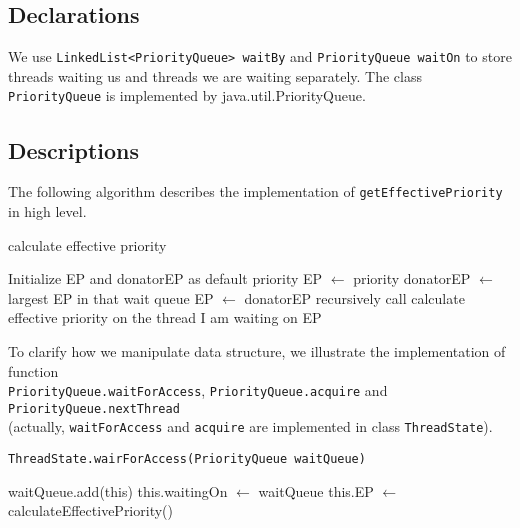\documentclass{article}
\begin{document}
\begin{spacing}{1.1}
    \subsection{Declarations}

    We use \texttt{LinkedList<PriorityQueue> waitBy} and \texttt{PriorityQueue waitOn} to store threads waiting us and threads we are waiting separately. The class \texttt{PriorityQueue} is implemented by java.util.PriorityQueue.

    \subsection{Descriptions}

    The following algorithm describes the implementation of \texttt{getEffectivePriority} in high level.

    \begin{algorithm}
      \caption{calculate effective priority}
      \begin{algorithmic}[1]
	\STATE Initialize EP and donatorEP as default priority
	\STATE EP $\leftarrow$ priority
	\STATE donatorEP $\leftarrow$ largest EP in that wait queue
	\STATE EP $\leftarrow$ donatorEP
	\ENDIF
	\ENDFOR
	\STATE recursively call calculate effective priority on the thread I am waiting on
	\RETURN EP
      \end{algorithmic}
    \end{algorithm}

    To clarify how we manipulate data structure, we illustrate the implementation of function \\
    \texttt{PriorityQueue.waitForAccess}, \texttt{PriorityQueue.acquire} and \texttt{PriorityQueue.nextThread} \\
    (actually, \texttt{waitForAccess} and \texttt{acquire} are implemented in class \texttt{ThreadState}).

    \begin{algorithm}
      \caption{\texttt{ThreadState.wairForAccess(PriorityQueue waitQueue)}}
      \begin{algorithmic}[1]
	\STATE waitQueue.add(this)  
	\STATE this.waitingOn $\leftarrow$ waitQueue  
	\STATE this.EP $\leftarrow$ calculateEffectivePriority()  
	\RETURN
      \end{algorithmic}
    \end{algorithm}


\end{spacing}
\end{document}
